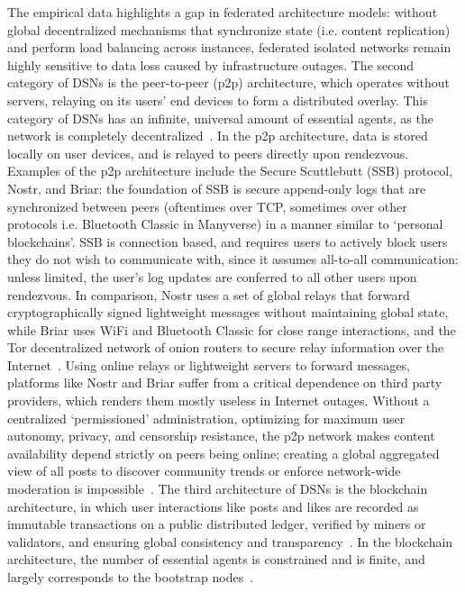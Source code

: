 The empirical data highlights a gap in federated architecture models: without global decentralized mechanisms that synchronize state (i.e. content replication) and perform load balancing across instances, federated isolated networks remain highly sensitive to data loss caused by infrastructure outages.
The second category of DSNs is the peer-to-peer (p2p) architecture, which operates without servers, relaying on its users' end devices to form a distributed overlay. This category of DSNs has an infinite, universal amount of essential agents, as the network is completely decentralized~\cite{Shapiro2026Platforms}. In the p2p architecture, data is stored locally on user devices, and is relayed to peers directly upon rendezvous. Examples of the p2p architecture include the Secure Scuttlebutt (SSB) protocol, Nostr, and Briar: the foundation of SSB is secure append-only logs that are synchronized between peers (oftentimes over TCP, sometimes over other protocols i.e. Bluetooth Classic in Manyverse) in a manner similar to `personal blockchains'.
SSB is connection based, and requires users to actively block users they do not wish to communicate with, since it assumes all-to-all communication: unless limited, the user's log updates are conferred to all other users upon rendezvous. In comparison, Nostr uses a set of global relays that forward cryptographically signed lightweight messages without maintaining global state, while Briar uses WiFi and Bluetooth Classic for close range interactions, and the Tor decentralized network of onion routers to secure relay information over the Internet~\cite{briar}.
Using online relays or lightweight servers to forward messages, platforms like Nostr and Briar suffer from a critical dependence on third party providers, which renders them mostly useless in Internet outages.
Without a centralized `permissioned' administration, optimizing for maximum user autonomy, privacy, and censorship resistance, the p2p network makes content availability depend strictly on peers being online; creating a global aggregated view of all posts to discover community trends or enforce network-wide moderation is impossible~\cite{Jeong2025}.
The third architecture of DSNs is the blockchain architecture, in which user interactions like posts and likes are recorded as immutable transactions on a public distributed ledger, verified by miners or validators, and ensuring global consistency and transparency~\cite{Jeong2025}.
In the blockchain architecture, the number of essential agents is constrained and is finite, and largely corresponds to the bootstrap nodes~\cite{Shapiro2026Platforms}.

